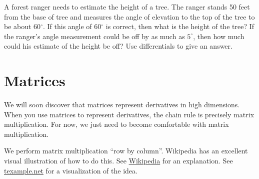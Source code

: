 \begin{problem}
A forest ranger needs to estimate the height of a tree.  The ranger stands 50 feet from the base of tree and measures the angle of elevation to the top of the tree to be about 60$^\circ$. If this angle of 60$^\circ$ is correct, then what is the height of the tree? If the ranger's angle measurement could be off by as much as $5^\circ$, then how much could his estimate of the height be off? Use differentials to give an answer.
\end{problem}



\section{Matrices}\label{review matrices}
We will soon discover that matrices represent derivatives in high dimensions. When you use matrices to represent derivatives, the chain rule is precisely matrix multiplication. For now, we just need to become comfortable with matrix multiplication.

We perform matrix multiplication ``row by column''.  Wikipedia has an excellent visual illustration of how to do this. See 
\href{http://en.wikipedia.org/wiki/Matrix\_multiplication}{Wikipedia} for an explanation. See \href{http://www.texample.net/tikz/examples/matrix-multiplication/}{texample.net} for a visualization of the idea.

